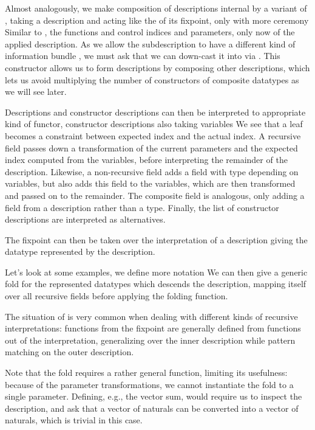 Almost analogously, we make composition of descriptions internal by a variant of , taking a description and acting like the  of its fixpoint, only with more ceremony
Similar to , the functions  and  control indices and parameters, only now of the applied description. As we allow the subdescription  to have a different kind of information bundle , we must ask that we can down-cast it into  via . This constructor allows us to form descriptions by composing other descriptions, which lets us avoid multiplying the number of constructors of composite datatypes as we will see later.

Descriptions and constructor descriptions can then be interpreted to appropriate kind of functor, constructor descriptions also taking variables
We see that a leaf becomes a constraint between expected index and the actual index. A recursive field passes down a transformation of the current parameters and the expected index computed from the variables, before interpreting the remainder of the description. Likewise, a non-recursive field adds a field with type depending on variables, but also adds this field to the variables, which are then transformed and passed on to the remainder. The composite field is analogous, only adding a field from a description rather than a type. Finally, the list of constructor descriptions are interpreted as alternatives.

The fixpoint can then be taken over the interpretation of a description
giving the datatype represented by the description.

Let's look at some examples, we define more notation
We can then give a generic fold for the represented datatypes
which descends the description, mapping itself over all recursive fields before applying the folding function.
\begin{remark}
    The situation of  is very common when dealing with different kinds of recursive interpretations: functions from the fixpoint are generally defined from functions out of the interpretation, generalizing over the inner description while pattern matching on the outer description. 
\end{remark}
Note that the fold requires a rather general function, limiting its usefulness: because of the parameter transformations, we cannot instantiate the fold to a single parameter. Defining, e.g., the vector sum, would require us to inspect the description, and ask that a vector of naturals can be converted into a vector of naturals, which is trivial in this case.

